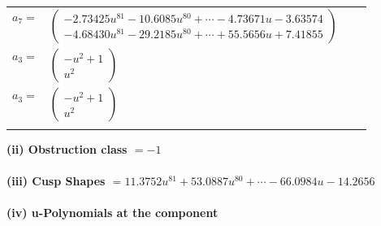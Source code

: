 \documentclass[1p]{elsarticle_modified}
\theoremstyle{definition}
\begin{document}
\begin{tabular}{m{7pt} m{180pt} m{7pt} m{180pt} }
\flushright $a_{7}=$&$\begin{pmatrix}-2.73425 u^{81}-10.6085 u^{80}+\cdots-4.73671 u-3.63574\\-4.68430 u^{81}-29.2185 u^{80}+\cdots+55.5656 u+7.41855\end{pmatrix}$ \\
\flushright $a_{3}=$&$\begin{pmatrix}- u^2+1\\u^2\end{pmatrix}$\\ \flushright $a_{3}=$&$\begin{pmatrix}- u^2+1\\u^2\end{pmatrix}$\\&\end{tabular}
\flushleft \textbf{(ii) Obstruction class $= -1$}\\~\\
\flushleft \textbf{(iii) Cusp Shapes $= 11.3752 u^{81}+53.0887 u^{80}+\cdots-66.0984 u-14.2656$}\\~\\
\newpage\renewcommand{\arraystretch}{1}
\flushleft \textbf{(iv) u-Polynomials at the component}\newline \\
\end{document}
